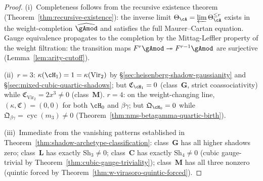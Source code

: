 \begin{proof}
(i)~Completeness follows from the recursive existence theorem
(Theorem~\ref{thm:recursive-existence}): the inverse limit
$\Theta_\cA = \varprojlim \Theta_\cA^{\leq r}$ exists in the
weight-completion $\widehat{\gAmod}$ and satisfies the full
Maurer--Cartan equation.  Gauge equivalence propagates to the
completion by the Mittag-Leffler property of the weight
filtration: the transition maps
$F^r \gAmod \twoheadrightarrow F^{r-1} \gAmod$
are surjective (Lemma~\ref{lem:arity-cutoff}).

(ii)~$r = 3$: $\kappa(\cH_1) = 1 = \kappa(\mathrm{Vir}_2)$
by \S\ref{sec:heisenberg-shadow-gaussianity} and
\S\ref{sec:mixed-cubic-quartic-shadows}; but
$\mathfrak{C}_{\cH_1} = 0$
(class~$\mathbf{G}$, strict coassociativity) while
$\mathfrak{C}_{\mathrm{Vir}_2} = 2x^3 \neq 0$
(class~$\mathbf{M}$).
$r = 4$: on the weight-changing line,
$(\kappa, \mathfrak{C}) = (0,0)$ for both $\cH_0$ and
$\beta\gamma$; but $\mathfrak{Q}_{\cH_0} = 0$
while $\mathfrak{Q}_{\beta\gamma} =
\operatorname{cyc}(m_3) \neq 0$
(Theorem~\ref{thm:nms-betagamma-quartic-birth}).

(iii)~Immediate from the vanishing patterns established in
Theorem~\ref{thm:shadow-archetype-classification}:
class~$\mathbf{G}$ has all higher shadows zero;
class~$\mathbf{L}$ has exactly $\mathrm{Sh}_3 \neq 0$;
class~$\mathbf{C}$ has exactly $\mathrm{Sh}_4 \neq 0$
(cubic gauge-trivial by
Theorem~\ref{thm:cubic-gauge-triviality});
class~$\mathbf{M}$ has all three nonzero
(quintic forced by
Theorem~\ref{thm:w-virasoro-quintic-forced}).
\end{proof}


